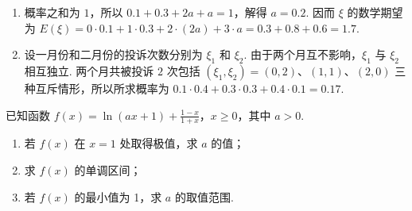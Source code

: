 \begin{solution}
\begin{enumerate}
\item 概率之和为 \(1\)，所以 \(0.1+0.3+2a+a=1\)，解得 \(a=0.2\). 因而 \(\xi\) 的数学期望为 \(E\left(\xi\right)=0\cdot0.1+1\cdot0.3+2\cdot\left(2a\right)+3\cdot a=0.3+0.8+0.6=1.7\).
\item 设一月份和二月份的投诉次数分别为 \(\xi_{1}\) 和 \(\xi_{2}\). 由于两个月互不影响，\(\xi_{1}\) 与 \(\xi_{2}\) 相互独立. 两个月共被投诉 \(2\) 次包括 \(\left(\xi_{1},\xi_{2}\right)=\left(0,2\right)\)、\(\left(1,1\right)\)、\(\left(2,0\right)\) 三种互斥情形，所以所求概率为 \(0.1\cdot0.4+0.3\cdot0.3+0.4\cdot0.1=0.17\).
\end{enumerate}
\end{solution}

\begin{problem}
已知函数 \(f\left(x\right) = \ln\left(ax + 1\right) + \frac{1 - x}{1 + x}\)，\(x \geqslant 0\)，其中 \( a > 0 \).

\begin{enumerate}
\item 若 \( f\left(x\right) \) 在 \( x = 1 \) 处取得极值，求 \( a \) 的值；
\item 求 \( f\left(x\right) \) 的单调区间；
\item 若 \( f\left(x\right) \) 的最小值为 1，求 \(a\) 的取值范围.
\end{enumerate}
\end{problem}

